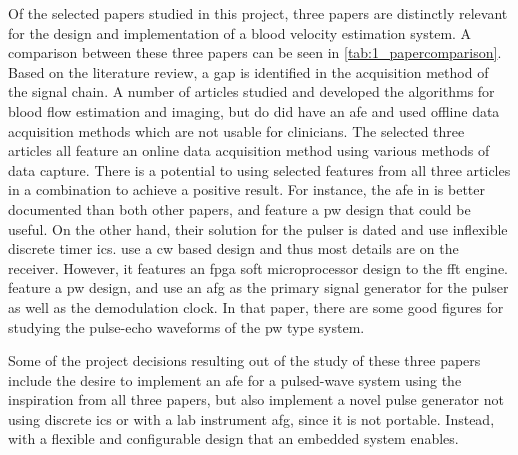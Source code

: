 Of the selected papers studied in this project, three papers are distinctly relevant for the design and implementation of a blood velocity estimation system. A comparison between these three papers can be seen in \cref{tab:1_papercomparison}. Based on the literature review, a gap is identified in the acquisition method of the signal chain. A number of articles studied and developed the algorithms for blood flow estimation and imaging, but do did have an \gls{afe} and used offline data acquisition methods which are not usable for clinicians. The selected three articles all feature an online data acquisition method using various methods of data capture. There is a potential to using selected features from all three articles in a combination to achieve a positive result. For instance, the \gls{afe} in \citeauthor{Huang_Smartphone_2012} is better documented than both other papers, and feature a \gls{pw} design that could be useful. On the other hand, their solution for the pulser is dated and use inflexible discrete timer \gls{ic}s. \citeauthor{JanaSmartphone2020} use a \gls{cw} based design and thus most details are on the receiver. However, it features an \gls{fpga} \gls{soft microprocessor} design to the \gls{fft} engine. \citeauthor{DingPMUTs} feature a \gls{pw} design, and use an \gls{afg} as the primary signal generator for the pulser as well as the demodulation clock. In that paper, there are some good figures for studying the pulse-echo waveforms of the \gls{pw} type system.

Some of the project decisions resulting out of the study of these three papers include the desire to implement an \gls{afe} for a pulsed-wave system using the inspiration from all three papers, but also implement a novel pulse generator not using discrete \gls{ic}s or with a lab instrument \gls{afg}, since it is not portable. Instead, with a flexible and configurable design that an embedded system enables.

